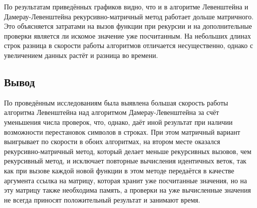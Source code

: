 По результатам приведённых графиков видно, что и в алгоритме Левенштейна и Дамерау-Левенштейна рекурсивно-матричный метод работает дольше матричного. Это объясняется затратами на вызов функции при рекурсии и на дополнительные проверки является ли искомое значение уже посчитанным. На небольших длинах строк разница в скорости работы алгоритмов отличается несущественно, однако с увеличением данных растёт и разница во времени.

\subsection*{Вывод}

\hspace{1.25cm}
По проведённым исследованиям была выявлена большая скорость работы алгоритма Левенштейна над алгоритмом Дамерау-Левенштейна за счёт уменьшения числа проверок, что, однако, даёт иной результат при наличии возможности перестановок символов в строках. При этом матричный вариант выигрывает по скорости в обоих алгоритмах, на втором месте оказался рекурсивно-матричный метод, который делает меньше рекурсивных вызовов, чем рекурсивный метод, и исключает повторные вычисления идентичных веток, так как при вызове каждой новой функции в этом методе передаётся в качестве аргумента ссылка на матрицу, которая хранит уже посчитанные значения, но на эту матрицу также необходима память, а проверки на уже вычисленные значения не всегда приносят положительный результат и занимают время.

\newpage